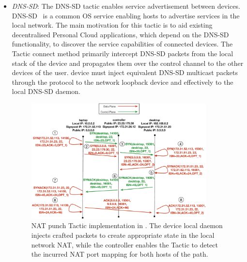 \begin{itemize}
  \item \emph{DNS-SD}: The DNS-SD tactic enables service advertisement between
    \signpost devices. DNS-SD~\cite{RFC6763} is a common OS service enabling
    hosts to advertise services in the local network.  The main motivation for
    this tactic is to aid existing decentralised Personal Cloud applications,
    which depend on the DNS-SD functionality, to discover the service
    capabilities of connected \signpost devices. The Tactic connect method
    primarily intercept DNS-SD packets from the local stack of the device and
    propagates them over the control channel to the other devices of the user.
    \signpost device must inject equivalent DNS-SD multicast packets through the
    \of protocol to the network loopback device and effectively to the local
    DNS-SD daemon.


\begin{figure}
  \begin{center}
	\includegraphics[width=0.9\textwidth]{nat-punch-example}
  \end{center}
  \caption[NAT punch tactic implementation in \signpost]{NAT punch Tactic
    implementation in \signpost. The device local \signpost daemon injects
    crafted packets to create appropriate state in the local network NAT, while
    the controller enables the Tactic to detect the incurred NAT port mapping
    for both hosts of the path.}
  \label{fig:signpost:nat-panch-example}
\end{figure}
  

\end{itemize}

